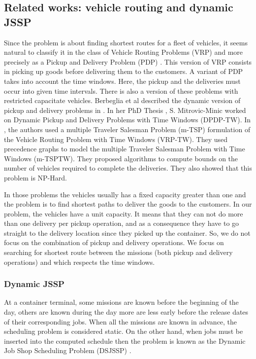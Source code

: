 \documentclass[a4paper,10pt]{article}
\begin{document}
\subsection{Related works: vehicle routing and dynamic JSSP}

Since the problem is about finding shortest routes for a fleet of vehicles, it seems natural to classify it in the class of Vehicle Routing Problems (VRP)\cite{Toth2001,Laporte1992} and more precisely as a Pickup and Delivery Problem (PDP) \cite{Berbeglia2007}. This version of VRP consists in picking up goods before delivering them to the customers. A variant of PDP takes into account the time windows\cite{Mitrovic1998}. Here, the pickup and the deliveries must occur into given time intervals. There is also a version of these problems with restricted capacitate vehicles\cite{Toth2001}.
Berbeglia et al described the dynamic version of pickup and delivery problems in \cite{Berbeglia2010}. In her PhD Thesis \cite{Mitrovic2001}, S. Mitrovic-Minic worked on Dynamic Pickup and Delivery Problems with Time Windows (DPDP-TW). In \cite{Mitrovic2006}, the authors used a multiple Traveler Salesman Problem (m-TSP) formulation of the Vehicle Routing Problem with Time Windows (VRP-TW). They used precedence graphs to model the multiple Traveler Salesman Problem with Time Windows (m-TSPTW). They proposed algorithms to compute bounds on the number of vehicles required to complete the deliveries. They also showed that this problem is NP-Hard.

In those problems the vehicles usually has a fixed capacity greater than one and the problem is to find shortest paths to deliver the goods to the customers. In our problem, the vehicles have a unit capacity. It means that they can not do more than one delivery per pickup operation, and as a consequence they have to go straight to the delivery location since they picked up the container. So, we do not focus on the combination of pickup and delivery operations. We focus on searching for shortest route between the missions (both pickup and delivery operations) and which respects the time windows.


\subsubsection{Dynamic JSSP}
At a container terminal, some missions are known before the beginning of the day, others are known during the day more are less early before the release dates of their corresponding jobs. When all the missions are known in advance, the scheduling problem is considered static. On the other hand, when jobs must be inserted into the computed schedule then the problem is known as the Dynamic Job Shop Scheduling Problem (DSJSSP) \cite{Ramasesh1990}. %
\end{document}

